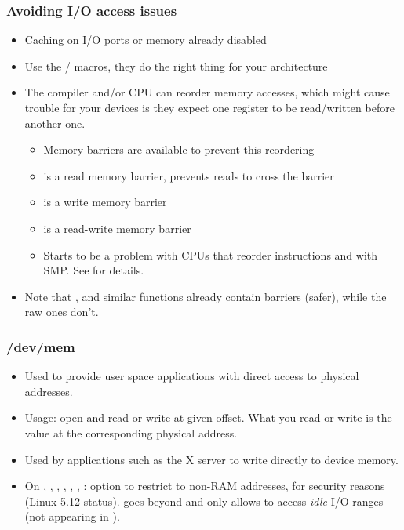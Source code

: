 \begin{frame}
  \frametitle{Avoiding I/O access issues}
  \begin{itemize}
  \item Caching on I/O ports or memory already disabled
  \item Use the / macros,
        they do the right thing for your architecture
  \item The compiler and/or CPU can reorder memory accesses, which
    might cause trouble for your devices is they expect one register
    to be read/written before another one.
    \begin{itemize}
    \item Memory barriers are available to prevent this reordering
    \item {} is a read memory barrier, prevents reads to
      cross the barrier
    \item {} is a write memory barrier
    \item {} is a read-write memory barrier
    \item Starts to be a problem with CPUs that reorder instructions and
          with SMP. See  for details.
    \end{itemize}
  \item Note that ,  and similar functions
        already contain barriers (safer), while the raw ones don't.
  \end{itemize}
\end{frame}

\begin{frame}
  \frametitle{/dev/mem}
  \begin{itemize}
  \item Used to provide user space applications with direct access to
    physical addresses.
  \item Usage: open  and read or write at given offset.
    What you read or write is the value at the corresponding physical
    address.
  \item Used by applications such as the X server to write directly to
    device memory.
  \item On , , , ,
    , , :
     option to restrict 
    to non-RAM addresses, for security reasons (Linux 5.12 status).
     goes beyond and only allows to access
    {\em idle} I/O ranges (not appearing in ).
\end{itemize}
\end{frame}
